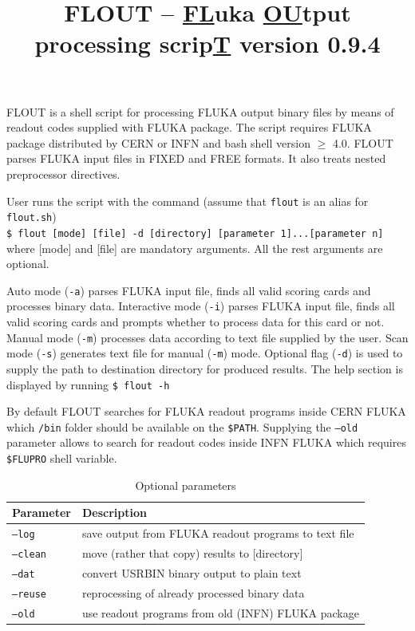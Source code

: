 \documentclass{article}
\title{FLOUT -- \underline{FL}uka \underline{OU}tput processing scrip\underline{T}\newline
\newline
version 0.9.4}
\begin{document}
\maketitle

FLOUT is a shell script for processing FLUKA output binary files by means of readout codes supplied with FLUKA package.
The script requires FLUKA package distributed by CERN or INFN and bash shell version $\geq$ 4.0.
FLOUT parses FLUKA input files in FIXED and FREE formats. It also treats nested preprocessor directives.

User runs the script with the command (assume that \texttt{flout} is an alias for \texttt{flout.sh})\\
\texttt{\$ flout [mode] [file] -d [directory] [parameter 1]...[parameter n]}\\
where [mode] and [file] are mandatory arguments. All the rest arguments are optional.

Auto mode (\texttt{-a}) parses FLUKA input file,
finds all valid scoring cards and processes binary data.
Interactive mode (\texttt{-i}) parses FLUKA input file,
finds all valid scoring cards and prompts whether to process data for this card or not.
Manual mode (\texttt{-m}) processes data according to text file supplied by the user.
Scan mode (\texttt{-s}) generates text file for manual (\texttt{-m}) mode.
Optional flag (\texttt{-d}) is used to supply the path to destination directory for produced results.
The help section is displayed by running \texttt{\$ flout -h}

By default FLOUT searches for FLUKA readout programs inside CERN FLUKA
which \texttt{/bin} folder should be available on the \texttt{\$PATH}.
Supplying the \texttt{--old} parameter allows to search for readout codes inside INFN FLUKA
which requires \texttt{\$FLUPRO} shell variable.

\begin{table}[htbp]
\centering
\caption{\label{tab:tabc}Optional parameters}
\begin{tabular}{|l|l|}
\hline
Parameter             & Description                                          \\
\hline
\texttt{--log}        & save output from FLUKA readout programs to text file \\
\texttt{--clean}      & move (rather that copy) results to [directory]       \\
\texttt{--dat}        & convert USRBIN binary output to plain text           \\
\texttt{--reuse}      & reprocessing of already processed binary data        \\
\texttt{--old}        & use readout programs from old (INFN) FLUKA package   \\
\hline
\end{tabular}
\end{table}
\end{document}
